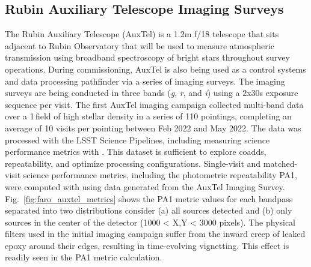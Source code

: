 \subsection{Rubin Auxiliary Telescope Imaging Surveys} \label{ssec:auxtel}

The Rubin Auxiliary Telescope\cite{10.1117/12.2561112} (AuxTel) is a 1.2m f/18 telescope that sits adjacent to Rubin Observatory that will be used to measure atmospheric transmission using broadband spectroscopy of bright stars throughout survey operations. 
During commissioning, AuxTel is also being used as a control systems and data processing pathfinder via a series of imaging surveys. The imaging surveys are being conducted in three bands (\emph{g}, \emph{r}, and \emph{i}) using a 2x30s exposure sequence per visit.
The first AuxTel imaging campaign collected multi-band data over a 1\,\degsq field of high stellar density in a series of 110 pointings, completing an average of 10 visits per pointing between Feb 2022 and May 2022. The data was processed with the LSST Science Pipelines, including measuring science performance metrics with \faro. This dataset is sufficient to explore coadds, repeatability, and optimize processing configurations.
Single-visit and matched-visit science performance metrics, including the photometric repeatability PA1, were computed with \faro using data generated from the AuxTel Imaging Survey.
Fig.~\ref{fig:faro_auxtel_metrics} shows the PA1 metric values for each bandpass separated into two distributions consider (a) all sources detected and (b) only sources in the center of the detector (1000 < X,Y < 3000 pixels). The physical filters used in the initial imaging campaign suffer from the inward creep of leaked epoxy around their edges, resulting in time-evolving vignetting. This effect is readily seen in the PA1 metric calculation.

